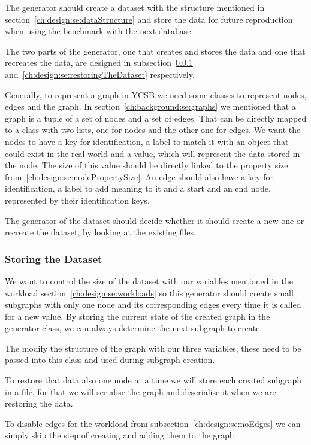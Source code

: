 The generator should create a dataset with the structure mentioned in section~\ref{ch:design:se:dataStructure} and store the data for future reproduction when using the benchmark with the next database.

The two parts of the generator,
one that creates and stores the data and one that recreates the data,
are designed in subsection~\ref{ch:design:se:storingTheDataset} and~\ref{ch:design:se:restoringTheDataset} respectively.

Generally,
to represent a graph in YCSB we need some classes to represent nodes, edges and the graph.
In section~\ref{ch:background:se:graphs} we mentioned that a graph is a tuple of a set of nodes and a set of edges.
That can be directly mapped to a class with two lists,
one for nodes and the other one for edges.
We want the nodes to have a key for identification,
a label to match it with an object that could exist in the real world and a value,
which will represent the data stored in the node.
The size of this value should be directly linked to the property size from~\ref{ch:design:se:nodePropertySize}.
An edge should also have a key for identification,
a label to add meaning to it and a start and an end node,
represented by their identification keys.

The generator of the dataset should decide whether it should create a new one or recreate the dataset,
by looking at the existing files.

\subsubsection{Storing the Dataset}
\label{ch:design:se:storingTheDataset}
We want to control the size of the dataset with our variables mentioned in the workload section~\ref{ch:design:se:workloads} so this generator should create small subgraphs with only one node and its corresponding edges every time it is called for a new value.
By storing the current state of the created graph in the generator class,
we can always determine the next subgraph to create.

The modify the structure of the graph with our three variables,
these need to be passed into this class and used during subgraph creation.

To restore that data also one node at a time we will store each created subgraph in a file,
for that we will serialise the graph and deserialise it when we are restoring the data.

To disable edges for the workload from subsection~\ref{ch:design:se:noEdges} we can simply skip the step of creating and adding them to the graph.

